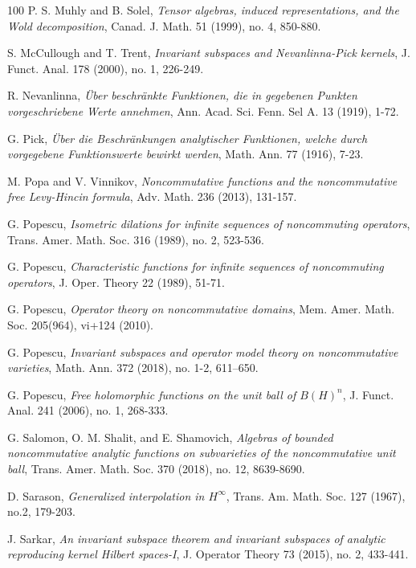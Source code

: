 \documentclass[12pt]{amsart}%
\numberwithin{equation}{section}
\begin{document}
\begin{thebibliography}{100}
 P. S. Muhly and B. Solel, {\em Tensor algebras, induced representations, and the Wold decomposition}, Canad. J. Math. 51 (1999), no. 4, 850-880.

 S. McCullough and T. Trent, {\em Invariant subspaces and Nevanlinna-Pick kernels}, J. Funct. Anal. 178 (2000), no. 1, 226-249.

 R. Nevanlinna, {\em \"Uber beschr\"ankte Funktionen, die in gegebenen Punkten vorgeschriebene Werte annehmen}, Ann. Acad. Sci. Fenn. Sel A. 13 (1919), 1-72. 

 G. Pick, {\em \"Uber die Beschr\"ankungen analytischer Funktionen, welche durch vorgegebene Funktionswerte bewirkt werden}, Math. Ann. 77 (1916), 7-23.


 M. Popa and V. Vinnikov, {\em Noncommutative functions and the noncommutative free Levy-Hincin formula}, Adv. Math. 236 (2013), 131-157.

 G. Popescu, {\em Isometric dilations for infinite sequences of noncommuting operators}, Trans. Amer. Math. Soc. 316 (1989), no. 2, 523-536.

G. Popescu, {\em Characteristic functions for infinite sequences of noncommuting operators}, J. Oper. Theory 22 (1989), 51-71.

G. Popescu, {\em Operator theory on noncommutative domains}, Mem. Amer. Math. Soc. 205(964), vi+124 (2010).

G. Popescu, {\em Invariant subspaces and operator model theory on noncommutative varieties}, Math. Ann. 372 (2018), no. 1-2, 611–650.

 G. Popescu, {\em Free holomorphic functions on the unit ball of $B(H)^n$}, J. Funct. Anal. 241 (2006), no. 1, 268-333.




 G. Salomon, O. M. Shalit, and E. Shamovich, {\em Algebras of bounded noncommutative analytic functions on subvarieties of the noncommutative unit ball}, Trans. Amer. Math. Soc. 370 (2018), no. 12, 8639-8690.

 D. Sarason, {\em Generalized interpolation in $H^{\infty}$}, Trans. Am. Math. Soc. 127 (1967), no.2, 179-203.



 J. Sarkar, {\em An invariant subspace theorem and invariant subspaces of analytic reproducing kernel Hilbert spaces-I}, J. Operator Theory 73 (2015), no. 2, 433-441.


\end{thebibliography}
\end{document}
